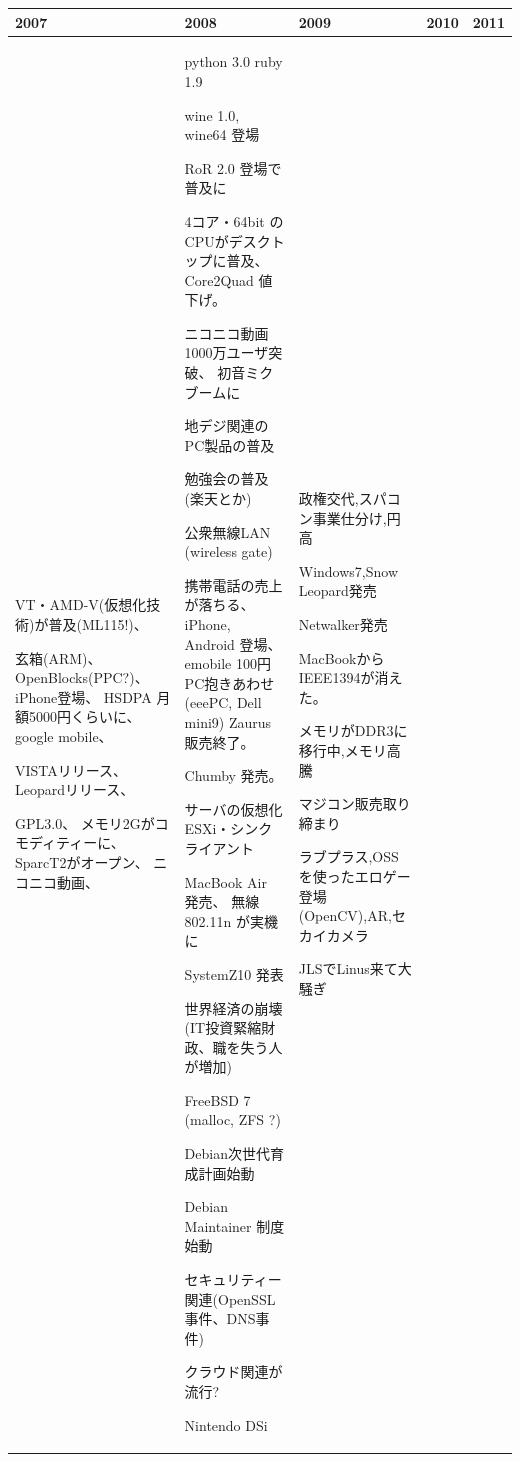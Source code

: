 \documentclass[mingoth,a4paper]{jsarticle}
\begin{document}
{\footnotesize
\begin{tabular}[t]{|p{5em}|p{11em}|p{14em}|p{12em}|p{5em}|}
\hline
2007 &2008 &2009 & 2010 & 2011 \\
\hline
VT・AMD-V(仮想化技術)が普及(ML115!)、

玄箱(ARM)、
OpenBlocks(PPC?)、
iPhone登場、 
HSDPA 月額5000円くらいに、
google mobile、

VISTAリリース、 
Leopardリリース、 

GPL3.0、
メモリ2Gがコモディティーに、
SparcT2がオープン、 
ニコニコ動画、
& 
python 3.0
ruby 1.9

wine 1.0, wine64 登場

RoR 2.0 登場で普及に

4コア・64bit のCPUがデスクトップに普及、
Core2Quad 値下げ。

ニコニコ動画1000万ユーザ突破、
初音ミクブームに

地デジ関連のPC製品の普及

勉強会の普及(楽天とか)

公衆無線LAN (wireless gate)

携帯電話の売上が落ちる、
iPhone, Android 登場、
emobile 100円PC抱きあわせ
(eeePC, Dell mini9)
Zaurus販売終了。

Chumby 発売。

サーバの仮想化 ESXi・シンクライアント

MacBook Air 発売、
無線 802.11n が実機に

SystemZ10 発表

世界経済の崩壊(IT投資緊縮財政、職を失う人が増加)

FreeBSD 7 (malloc, ZFS ?)

Debian次世代育成計画始動

Debian Maintainer 制度始動

セキュリティー関連(OpenSSL 事件、DNS事件)

クラウド関連が流行?

Nintendo DSi

&
政権交代,スパコン事業仕分け,円高

Windows7,Snow Leopard発売

Netwalker発売

MacBookからIEEE1394が消えた。

メモリがDDR3に移行中,メモリ高騰

マジコン販売取り締まり

ラブプラス,OSSを使ったエロゲー登場(OpenCV),AR,セカイカメラ

JLSでLinus来て大騒ぎ


\end{tabular}}
\end{document}
